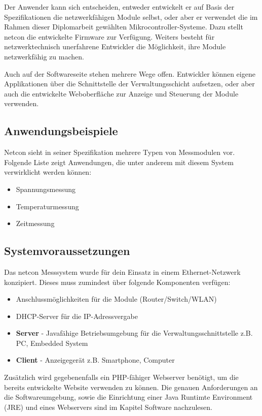 \documentclass[a4paper,14pt,headsepline]{scrartcl}
\begin{document}
Der Anwender kann sich entscheiden, entweder entwickelt er auf Basis der Spezifikationen die netzwerkfähigen Module selbst, oder aber er verwendet die im Rahmen dieser Diplomarbeit gewählten Mikrocontroller-Systeme. Dazu stellt netcon die entwickelte Firmware zur Verfügung. Weiters besteht für netzwerktechnisch unerfahrene Entwickler die Möglichkeit, ihre Module netzwerkfähig zu machen.
\newpage

Auch auf der Softwareseite stehen mehrere Wege offen. Entwickler können eigene Applikationen über die Schnittstelle der Verwaltungsschicht aufsetzen, oder aber auch die entwickelte Weboberfläche zur Anzeige und Steuerung der Module verwenden.

\subsection{Anwendungsbeispiele}
Netcon sieht in seiner Spezifikation mehrere Typen von Messmodulen vor. Folgende Liste zeigt Anwendungen, die unter anderem mit diesem System verwirklicht werden können:
\begin{itemize}
	\item Spannungsmessung
	\item Temperaturmessung
	\item Zeitmessung
\end{itemize}

\newpage

\subsection{Systemvoraussetzungen}

Das netcon Messsystem wurde für dein Einsatz in einem Ethernet-Netzwerk konzipiert. Dieses muss zumindest über folgende Komponenten verfügen:
\begin{itemize}
	\item Anschlussmöglichkeiten für die Module (Router/Switch/WLAN)
	\item DHCP-Server für die IP-Adressvergabe
	\item \textbf{Server} - Javafähige Betriebsumgebung für die Verwaltungsschnittstelle z.B. PC, Embedded System
	\item \textbf{Client} - Anzeigegerät z.B. Smartphone, Computer
\end{itemize}

Zusätzlich wird gegebenenfalls ein PHP-fähiger Webserver benötigt, um die bereits entwickelte Website verwenden zu können. Die genauen Anforderungen an die Softwareumgebung, sowie die Einrichtung einer Java Runtimte Environment (JRE) und eines Webservers sind im Kapitel Software nachzulesen.
\end{document}
